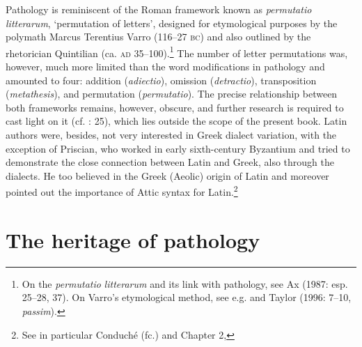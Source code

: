 Pathology is reminiscent of the Roman framework known as \textit{permutatio} \textit{litterarum}, ‘permutation of letters’, designed for etymological purposes by the polymath Marcus Terentius Varro (116–27 \textsc{bc}) and also outlined by the rhetorician Quintilian (ca. \textsc{ad} 35–100).\footnote{ \textrm{On the} \textrm{\textit{permutatio} \textit{litterarum} }\textrm{and its link with pathology, see Ax (1987: esp. 25–28, 37). On Varro’s etymological method, see e.g. \citet{Pfaffel1981} and Taylor (1996: 7–10,} \textrm{\textit{passim}}).} The number of letter permutations was, however, much more limited than the word modifications in pathology and amounted to four: addition (\textit{adiectio}), omission (\textit{detractio}), transposition (\textit{metathesis}), and permutation (\textit{permutatio}). The precise relationship between both frameworks remains, however, obscure, and further research is required to cast light on it (cf. \citealt{Ax1987}: 25), which lies outside the scope of the present book. Latin authors were, besides, not very interested in Greek dialect variation, with the exception of Priscian, who worked in early sixth-century Byzantium and tried to demonstrate the close connection between Latin and Greek, also through the dialects. He too believed in the Greek (Aeolic) origin of Latin and moreover pointed out the importance of Attic syntax for Latin.\footnote{ \textrm{See in particular Conduché (fc.) and Chapter 2, }}


\section{The heritage of pathology}

